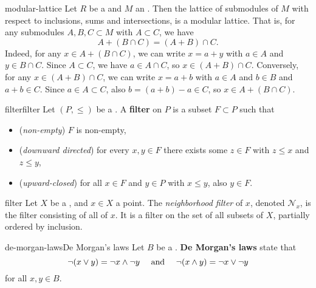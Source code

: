 \begin{example}{modular-lattice}
    Let $R$ be a  and $M$ an . Then the lattice of submodules of $M$ with respect to inclusions, sums and intersections, is a modular lattice. That is, for any submodules $A, B, C \subset M$ with $A \subset C$, we have
    \[ A + (B \cap C) = (A + B) \cap C . \]
    Indeed, for any $x \in A + (B \cap C)$, we can write $x = a + y$ with $a \in A$ and $y \in B \cap C$. Since $A \subset C$, we have $a \in A \cap C$, so $x \in (A + B) \cap C$. Conversely, for any $x \in (A + B) \cap C$, we can write $x = a + b$ with $a \in A$ and $b \in B$ and $a + b \in C$. Since $a \in A \subset C$, also $b = (a + b) - a \in C$, so $x \in A + (B \cap C)$.
\end{example}

\begin{topic}{filter}{filter}
    Let $(P, \le)$ be a . A \textbf{filter} on $P$ is a subset $F \subset P$ such that
    \begin{itemize}
        \item (\textit{non-empty}) $F$ is non-empty,
        \item (\textit{downward directed}) for every $x, y \in F$ there exists some $z \in F$ with $z \le x$ and $z \le y$,
        \item (\textit{upward-closed}) for all $x \in F$ and $y \in P$ with $x \le y$, also $y \in F$.
    \end{itemize}
\end{topic}

\begin{example}{filter}
    Let $X$ be a , and $x \in X$ a point. The \textit{neighborhood filter} of $x$, denoted $\mathcal{N}_x$, is the filter consisting of all  of $x$. It is a filter on the set of all subsets of $X$, partially ordered by inclusion.
\end{example}

\begin{topic}{de-morgan-laws}{De Morgan's laws}
    Let $B$ be a . \textbf{De Morgan's laws} state that
    \[ \neg (x \lor y) = \neg x \land \neg y \quad \textup{ and } \quad \neg (x \land y) = \neg x \lor \neg y \]
    for all $x, y \in B$.
\end{topic}

